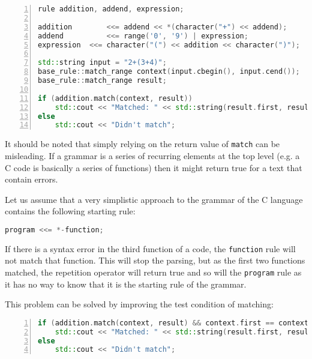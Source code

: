 \documentclass[12pt]{article}
\begin{document}
\begin{center}
	\begin{minipage}[h]{0.8\textwidth}
		\begin{lstlisting}[language=C++, breaklines=true, numbers=left]
rule addition, addend, expression;

addition		<<= addend << *(character("+") << addend);
addend			<<= range('0', '9') | expression;
expression	<<= character("(") << addition << character(")");

std::string input = "2+(3+4)";
base_rule::match_range context(input.cbegin(), input.cend());
base_rule::match_range result;

if (addition.match(context, result))
	std::cout << "Matched: " << std::string(result.first, result.second);
else
	std::cout << "Didn't match";
		\end{lstlisting}
	\end{minipage}
\end{center}

It should be noted that simply relying on the return value of \texttt{match} can be misleading. If a grammar
is a series of recurring elements at the top level (e.g. a C code is basically a series of functions) then it
might return true for a text that contain errors.

Let us assume that a very simplistic approach to the grammar of the C language contains the following starting
rule:
\begin{center}
	\begin{minipage}[h]{0.4\textwidth}
		\begin{lstlisting}[language=c++]
program <<= *-function;
		\end{lstlisting}
	\end{minipage}
\end{center}

If there is a syntax error in the third function of a code, the \texttt{function} rule will not match that
function. This will stop the parsing, but as the first two functions matched, the repetition operator will
return true and so will the \texttt{program} rule as it has no way to know that it is the starting rule of the
grammar.

This problem can be solved by improving the test condition of matching:
\begin{center}
	\begin{minipage}[h]{0.8\textwidth}
		\begin{lstlisting}[language=C++, breaklines=true, numbers=left]
if (addition.match(context, result) && context.first == context.second)
	std::cout << "Matched: " << std::string(result.first, result.second);
else
	std::cout << "Didn't match";
		\end{lstlisting}
	\end{minipage}
\end{center}
\end{document}
